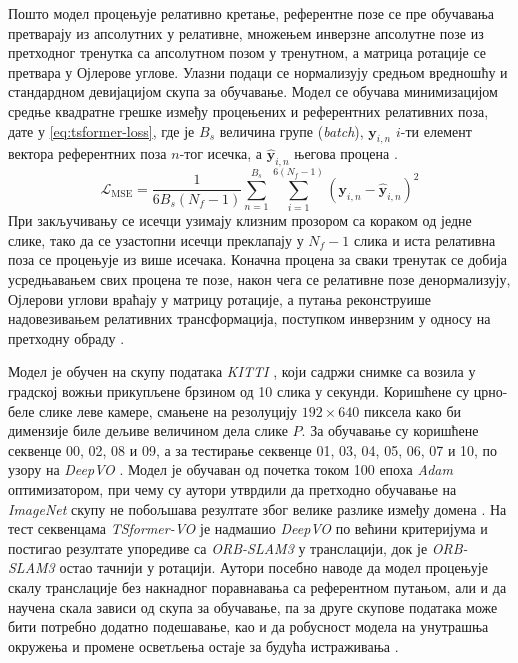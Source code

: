 \documentclass[12pt]{article}
\begin{document}
Пошто модел процењује релативно кретање, референтне позе се пре обучавања
претварају из апсолутних у релативне, множењем инверзне апсолутне позе из
претходног тренутка са апсолутном позом у тренутном, а матрица ротације се
претвара у Ојлерове углове. Улазни подаци се нормализују средњом вредношћу и
стандардном девијацијом скупа за обучавање.
Модел се обучава минимизацијом средње квадратне грешке између процењених и
референтних релативних поза, дате у \eqref{eq:tsformer-loss}, где је $B_s$
величина групе (\textit{batch}), $\mathbf{y}_{i,n}$ $i$-ти елемент вектора
референтних поза $n$-тог исечка, а $\hat{\mathbf{y}}_{i,n}$ његова процена
\cite{Francani2025}.
\begin{equation}
	\mathcal{L}_{\mathrm{MSE}} = \dfrac{1}{6 B_s \left(N_f - 1\right)} \sum_{n=1}^{B_s} \sum_{i=1}^{6\left(N_f - 1\right)} \left(\mathbf{y}_{i,n} - \hat{\mathbf{y}}_{i,n}\right)^2
	\label{eq:tsformer-loss}
\end{equation}
При закључивању се исечци узимају клизним прозором са кораком од једне слике,
тако да се узастопни исечци преклапају у $N_f - 1$ слика и иста релативна поза
се процењује из више исечака. Коначна процена за сваки тренутак се добија
усредњавањем свих процена те позе, након чега се релативне позе денормализују,
Ојлерови углови враћају у матрицу ротације, а путања реконструише
надовезивањем релативних трансформација, поступком инверзним у односу на
претходну обраду \cite{Francani2025}.

Модел је обучен на скупу података \textit{KITTI} \cite{kitti_benchmark}, који
садржи снимке са возила у градској вожњи прикупљене брзином од 10 слика у
секунди. Коришћене су црно-беле слике леве камере, смањене на резолуцију
$192 \times 640$ пиксела како би димензије биле дељиве величином дела слике
$P$. За обучавање су коришћене секвенце 00, 02, 08 и 09, а за тестирање
секвенце 01, 03, 04, 05, 06, 07 и 10, по узору на \textit{DeepVO}
\cite{wang2017deepvo}. Модел је обучаван од почетка током 100 епоха
\textit{Adam} оптимизатором, при чему су аутори утврдили да претходно
обучавање на \textit{ImageNet} скупу не побољшава резултате због велике
разлике између домена \cite{Francani2025}. На тест секвенцама
\textit{TSformer-VO} је надмашио \textit{DeepVO} по већини критеријума и
постигао резултате упоредиве са \textit{ORB-SLAM3} у транслацији, док је
\textit{ORB-SLAM3} остао тачнији у ротацији. Аутори посебно наводе да модел
процењује скалу транслације без накнадног поравнавања са референтном путањом,
али и да научена скала зависи од скупа за обучавање, па за друге скупове
података може бити потребно додатно подешавање, као и да робусност модела на
унутрашња окружења и промене осветљења остаје за будућа истраживања
\cite{Francani2025}.
\end{document}
